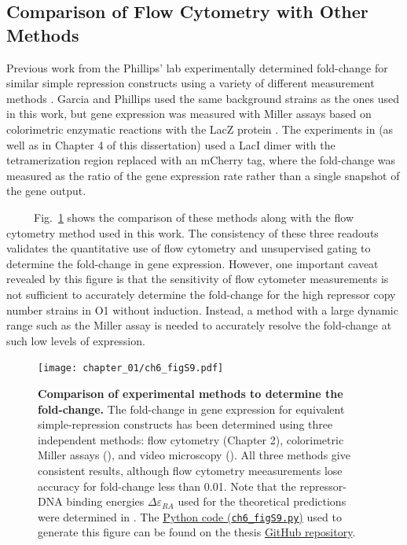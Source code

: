 \documentclass[12pt]{caltech_thesis}
\begin{document}
\hypertarget{comparison-of-flow-cytometry-with-other-methods}{%
\subsection{Comparison of Flow Cytometry with Other
Methods}\label{comparison-of-flow-cytometry-with-other-methods}}

Previous work from the Phillips' lab experimentally determined
fold-change for similar simple repression constructs using a variety of
different measurement methods \autocite{garcia2011b}. Garcia and
Phillips used the same background strains as the ones used in this work,
but gene expression was measured with Miller assays based on
colorimetric enzymatic reactions with the LacZ protein
\autocite{garcia2011}. The experiments in \textcite{brewster2014} (as
well as in Chapter 4 of this dissertation) used a LacI dimer with the
tetramerization region replaced with an mCherry tag, where the
fold-change was measured as the ratio of the gene expression rate rather
than a single snapshot of the gene output.

~~~~~Fig.~\ref{fig:new_old_comparison} shows the comparison of these
methods along with the flow cytometry method used in this work. The
consistency of these three readouts validates the quantitative use of
flow cytometry and unsupervised gating to determine the fold-change in
gene expression. However, one important caveat revealed by this figure
is that the sensitivity of flow cytometer measurements is not sufficient
to accurately determine the fold-change for the high repressor copy
number strains in O1 without induction. Instead, a method with a large
dynamic range such as the Miller assay is needed to accurately resolve
the fold-change at such low levels of expression.

\hypertarget{fig:new_old_comparison}{%
\begin{figure}
\centering
\texttt{[image: chapter\_01/ch6\_figS9.pdf]}
\caption[{Comparison of experimental methods to determine the
fold-change in gene expression.}]{\textbf{Comparison of experimental
methods to determine the fold-change.} The fold-change in gene
expression for equivalent simple-repression constructs has been
determined using three independent methods: flow cytometry (Chapter 2),
colorimetric Miller assays (\textcite{garcia2011}), and video microscopy
(\textcite{brewster2014}). All three methods give consistent results,
although flow cytometry meeasurements lose accuracy for fold-change less
than 0.01. Note that the repressor-DNA binding energies
\(\Delta\varepsilon_{RA}\) used for the theoretical predictions were
determined in \textcite{garcia2011}. The
\href{https://github.com/gchure/phd/blob/master/src/chapter_06/code/ch6_figS9.py}{Python
code (\texttt{ch6\_figS9.py})} used to generate this figure can be found
on the thesis \href{https://github.com/gchure/phd}{GitHub repository}.}
\label{fig:new_old_comparison}
\end{figure}
}
\end{document}
